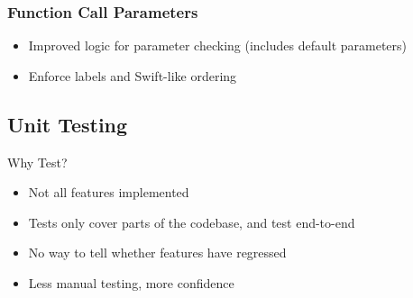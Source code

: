 \documentclass[aspectratio=169]{beamer}
\begin{document}
\begin{frame}
\frametitle{Function Call Parameters}
\begin{itemize}
    \item Improved logic for parameter checking (includes default parameters)
    \item Enforce labels and Swift-like ordering
\end{itemize}
\end{frame}

\subsection{Unit Testing}
\begin{frame}{Why Test?}
\begin{itemize}
    \item Not all features implemented
    \item Tests only cover parts of the codebase, and test end-to-end
    \item No way to tell whether features have regressed
    \item Less manual testing, more confidence
\end{itemize}
\end{frame}
\end{document}
